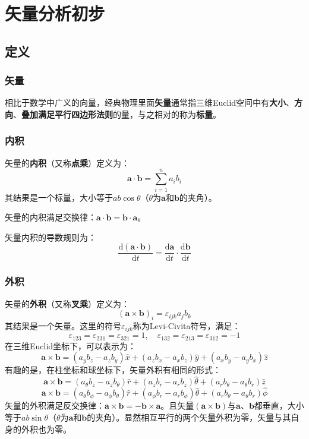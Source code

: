 \documentclass[fontset=none,openany,a4paper]{ctexbook}
\begin{document}
\chapter{矢量分析初步}

\section{定义}

\subsection{矢量}

相比于数学中广义的向量，经典物理里面\textbf{矢量}通常指三维Euclid空间中有\textbf{大小}、\textbf{方向}、\textbf{叠加满足平行四边形法则}的量，与之相对的称为\textbf{标量}。

\subsection{内积}

矢量的\textbf{内积}（又称\textbf{点乘}）定义为：
\[
\bm{a} \cdot \bm{b} = \sum_{i=1}^n a_i b_i
\]
其结果是一个标量，大小等于$ab\cos\theta$（$\theta$为$\bm{a}$和$\bm{b}$的夹角）。

矢量的内积满足交换律：$\bm{a}\cdot\bm{b}=\bm{b}\cdot\bm{a}$。

矢量内积的导数规则为：
\[
\frac{\mathrm{d}(\bm{a}\cdot\bm{b})}{\mathrm{d}t} = \frac{\mathrm{d}\bm{a}}{\mathrm{d}t} \cdot \frac{\mathrm{d}\bm{b}}{\mathrm{d}t}
\]

\subsection{外积}

矢量的\textbf{外积}（又称\textbf{叉乘}）定义为：
\[
(\bm{a} \times \bm{b})_i = \varepsilon_{ijk} a_j b_k
\]
其结果是一个矢量。这里的符号$\varepsilon_{ijk}$称为Levi-Civita符号，满足：
\[
\varepsilon_{123} = \varepsilon_{231} = \varepsilon_{321} = 1,\quad \varepsilon_{132} = \varepsilon_{213} = \varepsilon_{312} = -1
\]
在三维Euclid坐标下，可以表示为：
\[
\bm{a} \times \bm{b} = (a_y b_z - a_z b_y)\hat{x} + (a_z b_x - a_x b_z)\hat{y} + (a_x b_y - a_y b_x)\hat{z}
\]
有趣的是，在柱坐标和球坐标下，矢量外积有相同的形式：
\[
\bm{a} \times \bm{b} = (a_\theta b_z - a_z b_\theta)\hat{r} + (a_z b_r - a_r b_z)\hat{\theta} + (a_r b_\theta - a_\theta b_r)\hat{z}
\]
\[
\bm{a} \times \bm{b} = (a_\theta b_\phi - a_\phi b_\theta)\hat{r} + (a_\phi b_r - a_r b_\phi)\hat{\theta} + (a_r b_\theta - a_\theta b_r)\hat{\phi}
\]
矢量的外积满足反交换律：$\bm{a}\times\bm{b}=-\bm{b}\times\bm{a}$。且矢量$(\bm{a}\times\bm{b})$与$\bm{a}$、$\bm{b}$都垂直，大小等于$ab\sin\theta$（$\theta$为$\bm{a}$和$\bm{b}$的夹角）。显然相互平行的两个矢量外积为零，矢量与其自身的外积也为零。
\end{document}
